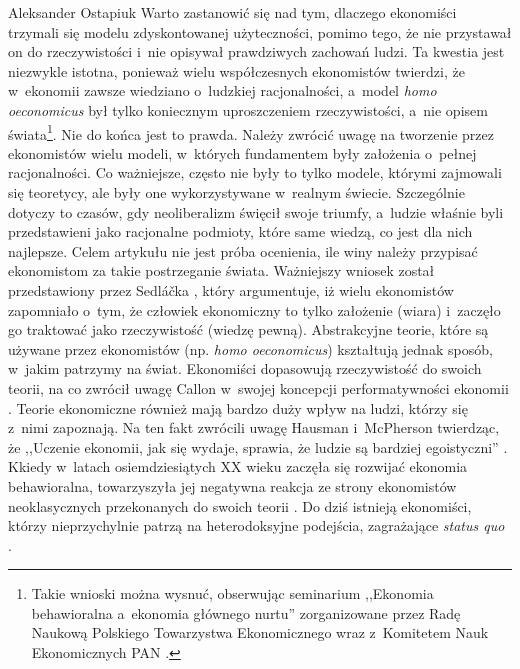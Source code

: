 \begin{artplenv}{Aleksander Ostapiuk}
Warto zastanowić się nad tym, dlaczego ekonomiści trzymali się modelu zdyskontowanej użyteczności, pomimo tego, że nie
przystawał on do rzeczywistości i~nie opisywał prawdziwych zachowań ludzi. Ta kwestia jest niezwykle istotna, ponieważ
wielu współczesnych ekonomistów twierdzi, że w~ekonomii zawsze wiedziano o~ludzkiej racjonalności,
a~model \textit{homo oeconomicus} był tylko koniecznym uproszczeniem rzeczywistości, a~nie opisem
świata\footnote{Takie wnioski można wysnuć, obserwując seminarium ,,Ekonomia behawioralna a~ekonomia głównego nurtu''
zorganizowane przez Radę Naukową Polskiego Towarzystwa Ekonomicznego wraz z~Komitetem Nauk Ekonomicznych PAN
\parencite[zob.][]{noauthor_stenogram_2018}.
}. Nie do końca jest to prawda. Należy zwrócić uwagę na tworzenie przez ekonomistów wielu modeli,
w~których fundamentem były założenia o~pełnej racjonalności. Co ważniejsze, często nie były to tylko modele, którymi
zajmowali się teoretycy, ale były one wykorzystywane w~realnym świecie. Szczególnie dotyczy to czasów, gdy
neoliberalizm święcił swoje triumfy, a~ludzie właśnie byli przedstawieni jako racjonalne podmioty, które same wiedzą, co
jest dla nich najlepsze. Celem artykułu nie jest próba ocenienia, ile winy należy przypisać ekonomistom za takie
postrzeganie świata. Ważniejszy wniosek został przedstawiony przez Sedláčka
\parencite*{sedlacek_ekonomia_2012_ost},
który
argumentuje, iż wielu ekonomistów zapomniało o~tym, że człowiek ekonomiczny to tylko założenie (wiara) i~zaczęło go
traktować jako rzeczywistość (wiedzę pewną). Abstrakcyjne teorie, które są używane przez ekonomistów (np. \textit{homo
oeconomicus}) kształtują jednak sposób, w~jakim patrzymy na świat. Ekonomiści dopasowują rzeczywistość do swoich teorii,
na co zwrócił uwagę Callon w~swojej koncepcji performatywności ekonomii
\parencites{callon_what_2006}[więcej zob.][]{boldyrev_enacting_2016}.
Teorie ekonomiczne również mają bardzo duży wpływ na ludzi, którzy się z~nimi
zapoznają. Na ten fakt zwrócili uwagę Hausman i~McPherson twierdząc, że ,,Uczenie ekonomii, jak się wydaje, sprawia, że
ludzie są bardziej egoistyczni''
\parencite[s.~674]{hausman_taking_1993}.
Kkiedy w~latach osiemdziesiątych XX wieku zaczęła się rozwijać ekonomia
behawioralna, towarzyszyła jej negatywna reakcja ze strony ekonomistów neoklasycznych przekonanych do swoich teorii
\parencite[zob.][]{thaler_misbehaving:_2015}.
Do dziś istnieją ekonomiści, którzy nieprzychylnie patrzą na heterodoksyjne podejścia, zagrażające
\textit{status quo}
\parencite[zob.][]{fourcade_superiority_2015,colander_how_2018}.


\end{artplenv}
